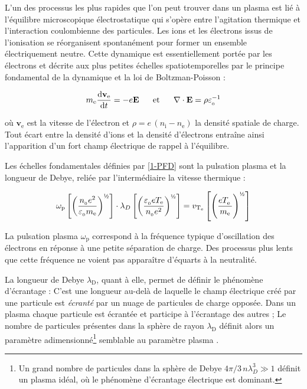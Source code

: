 \begin{refsection}
L'un des processus les plus rapides que l'on peut trouver dans un plasma est lié à
l'équilibre microscopique électrostatique qui s'opère
entre l'agitation thermique et l'interaction coulombienne des particules. Les
ions et les électrons issus de l'ionisation se réorganisent spontanément pour former un ensemble électriquement neutre.
Cette dynamique est essentiellement portée par les électrons et décrite aux plus petites
échelles spatiotemporelles par le principe fondamental de la dynamique et la loi de Boltzman-Poisson :

\begin{align}
\label{1-PFD}
m_\text{e}\frac{\text{d} \mathbf{v}_\text{e}}{\text{d} t}=-e\mathbf E
\;\;\;\;\;\;\text{et}\;\;\;\;\;\;
\nabla\cdot\mathbf{E}=\rho\varepsilon_{_{0}}^{{-1}}
\end{align}

où $\mathbf{v}_\text{e}$ est la vitesse de l'électron et
$\rho=e\,(n_\text{i}-n_\text{e})$ la densité spatiale de charge.
Tout écart entre la densité d'ions et la densité d'électrons
entraîne ainsi l'apparition d'un fort champ électrique de rappel à l'équilibre.

Les échelles fondamentales définies par \eqref{1-PFD} sont la pulsation
plasma et la longueur de Debye, reliée par l'intermédiaire la vitesse thermique :

\begin{equation}
\omega_\text{p}\left[\left(\frac{n\indice{0}
e\puissance{2}}{\varepsilon\indice{0} m_\text{e}}\right)^{\text{\textonehalf}}
\right]\cdot\lambda_D\left[\left(\frac{\varepsilon\indice{0}
eT_\text{e}}{n\indice{0} e\puissance{2}}\right)^{\text{\textonehalf}}\right]
=v_{\text{T}_\text{e}}\left[\left(\frac{eT_\text{e}^{^{\phantom{1}}}}{m_\text{e}}\right)^{\text{\textonehalf}}\right]
\end{equation}

La pulsation plasma $\omega_\text{p}$ correspond à la fréquence typique
d'oscillation des électrons en réponse à une petite séparation de charge. Des processus plus lents que cette fréquence ne voient
pas apparaître d'équarts à la neutralité. 

La longueur de Debye $\lambda_\text{D}$, quant à elle, permet de définir le
phénomène d'écrantage :
C'est une longueur au-delà de laquelle le champ électrique créé par une particule est \emph{écranté} par 
un nuage de particules de charge opposée. Dans un plasma chaque particule est écrantée et participe
à l'écrantage des autres ; Le nombre de particules présentes
dans la sphère de rayon $\lambda_\text{D}$ définit alors un paramètre
adimensionné\footnote{Un
grand nombre de particules dans la sphère de Debye $4\pi/3\,n\lambda_D^3\gg1$
définit un plasma idéal, où le phénomène d'écrantage électrique est
dominant.} semblable au paramètre plasma .


\end{refsection}
